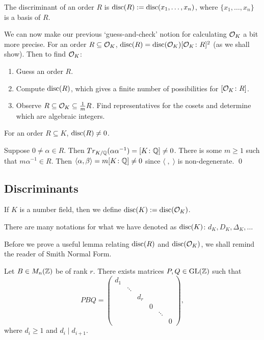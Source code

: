 \begin{dfn}
The discriminant of an order $R$ is $\operatorname{disc}(R):=\operatorname{disc}(x_1,\ldots,x_n)$, where $\{x_1,\ldots,x_n\}$ is a basis of $R$.
\end{dfn}

We can now make our previous `guess-and-check' notion for calculating $\mathcal{O}_K$ a bit more precise. For an order $R \subseteq \mathcal{O}_K$, $\operatorname{disc}(R)=\operatorname{disc}(\mathcal{O}_K) [\mathcal{O}_K \colon R]^2$ (as we shall show). Then to find $\mathcal{O}_K$:
	\begin{enumerate}[1.]
	\item Guess an order $R$.
	\item Compute $\operatorname{disc}(R)$, which gives a finite number of possibilities for $[\mathcal{O}_K \colon R]$.
	\item Observe $R \subseteq \mathcal{O}_K \subseteq \frac{1}{m} R$. Find representatives for the cosets and determine which are algebraic integers. 
	\end{enumerate}

\begin{prop}
For an order $R \subseteq K$, $\operatorname{disc}(R) \neq 0$.
\end{prop}

\pf Suppose $0 \neq \alpha \in R$. Then $Tr_{K/\mathbb{Q}}(\alpha\alpha^{-1})=[K \colon \mathbb{Q}] \neq 0$. There is some $m \geq 1$ such that $m \alpha^{-1} \in R$. Then $\langle \alpha,\beta \rangle= m[K \colon \mathbb{Q}] \neq 0$ since $\langle \;,\; \rangle$ is non-degenerate. \qed 


\subsection{Discriminants}


\begin{dfn}
If $K$ is a number field, then we define $\operatorname{disc}(K):= \operatorname{disc}(\mathcal{O}_K)$. 
\end{dfn}

\begin{rem}
There are many notations for what we have denoted as $\operatorname{disc}(K)$: $d_K,D_K,\Delta_K,\ldots$
\end{rem}


Before we prove a useful lemma relating $\operatorname{disc}(R)$ and $\operatorname{disc}(\mathcal{O}_K)$, we shall remind the reader of Smith Normal Form.

\begin{thm}
Let $B \in M_n(\mathbb{Z})$ be of rank $r$. There exists matrices $P,Q \in \operatorname{GL}(\mathbb{Z})$ such that
	\[
	PBQ=
	\begin{pmatrix}
	 d_1 &  &  &  &  & \\ 
	 &  \ddots &  &  &  & \\ 
	 &  &  d_r &  &  & \\ 
	 &  &  & 0 &  & \\ 
	 &  &  &  & \ddots & \\ 
	 &  &  &  &  & 0
	\end{pmatrix},
	\]
where $d_i \geq 1$ and $d_i \mid d_{i+1}$. 
\end{thm}

